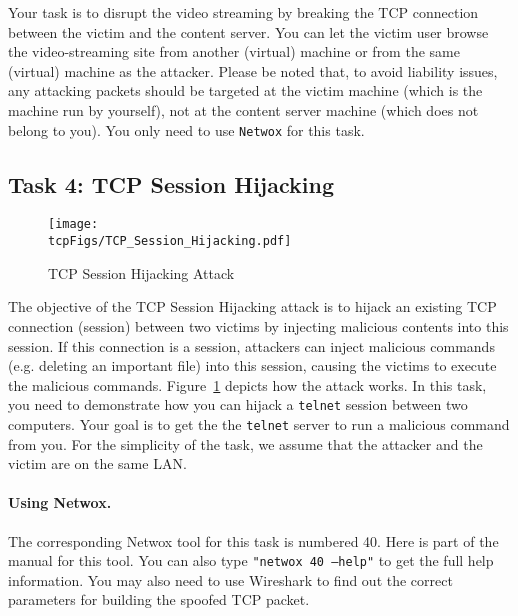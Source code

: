 Your task is to disrupt the video streaming by breaking the 
TCP connection between the victim and the content server.
You can let the victim user browse the video-streaming 
site from another (virtual) machine or from the same (virtual) machine
as the attacker. Please be noted that, to avoid liability issues,
any attacking packets should be targeted 
at the victim machine (which is the machine run by yourself), 
not at the content server machine (which does not belong to you).
You only need to use \texttt{Netwox} for this task.  

            

\subsection{Task 4: TCP Session Hijacking}



\begin{figure}[htb]
  \begin{center}
    \texttt{[image: \\tcpFigs/TCP\_Session\_Hijacking.pdf]}
  \end{center}
  \caption{TCP Session Hijacking Attack}
  \label{tcp:fig:hijacking}
\end{figure}
 
   
The objective of the TCP Session Hijacking attack is to hijack an 
existing TCP connection (session) between two victims by injecting malicious contents
into this session. If this connection is a \telnet session, attackers
can inject malicious commands (e.g. deleting an important file) 
into this session, causing the victims 
to execute the malicious commands. 
Figure~\ref{tcp:fig:hijacking} depicts how the attack works.
In this task, you need to demonstrate how you can hijack a 
\texttt{telnet} session between two computers. Your goal is to get the
the \texttt{telnet} server to run a malicious command from you.
For the simplicity of the task, we assume that 
the attacker and the victim are on the same LAN.



\paragraph{Using Netwox.}
The corresponding Netwox tool for this task is numbered 40. Here is part of
the manual for this tool. You can also type {\tt "netwox 40 --help"}
to get the full help information. You may also need to use Wireshark
to find out the correct parameters for building the spoofed TCP packet.


